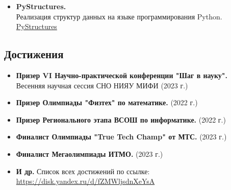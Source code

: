 \documentclass[14pt]{extarticle}
\begin{document}
\begin{minipage}{0.6\textwidth}
\begin{itemize}
            \item \textbf{PyStructures.} \\
                  Реализация структур данных на языке программирования Python. \\
                  \href{https://github.com/MichaelKolesnikov/PyStructures}{PyStructures}
      \end{itemize}
      \subsection*{Достижения}
      \begin{itemize}
            \item \textbf{Призер VI Научно-практической конференции "Шаг в науку".} \\
                  Весенняя научная сессия СНО НИЯУ МИФИ (2023 г.)

            \item \textbf{Призер Олимпиады "Физтех" по математике.} (2022 г.)

            \item \textbf{Призер Регионального этапа ВСОШ по информатике.} (2022 г.)

            \item \textbf{Финалист Олимпиады "True Tech Champ" от МТС.} (2023 г.)

            \item \textbf{Финалист Мегаолимпиады ИТМО.} (2023 г.)

            \item \textbf{И др.} Список всех достижений по ссылке: \\
                  \href{https://disk.yandex.ru/d/fZMWljsdnXeYsA}{https://disk.yandex.ru/d/fZMWljsdnXeYsA}
      \end{itemize}
\end{minipage}
\end{document}
